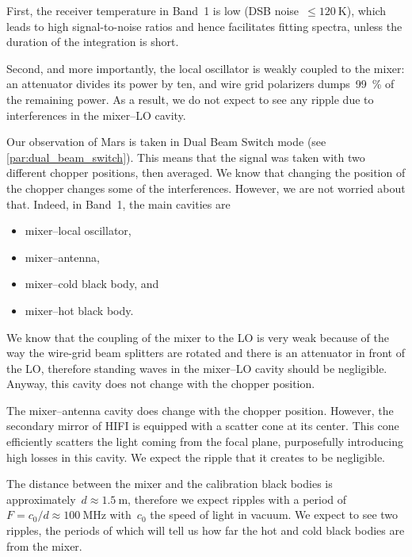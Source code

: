 First, the receiver temperature in Band~1 is low (DSB noise~$\le \SI{120}{\kelvin}$),
which leads to high signal-to-noise ratios
and hence facilitates fitting spectra, unless the duration of the integration
is short.

Second, and more importantly, the local oscillator is weakly coupled to the mixer:
an attenuator divides its power by ten, and wire grid polarizers dumps~\SI{99}{\percent} of the remaining power.
As a result, we do not expect to see any ripple due to interferences in the mixer--LO cavity.



Our observation of Mars is taken in Dual Beam Switch mode (see \vref{par:dual_beam_switch}).
This means that the signal was taken with two different chopper positions, then averaged.
We know that changing the position of the chopper changes some of the interferences.
However, we are not worried about that.
Indeed, in Band~1, the main cavities are
\begin{itemize}
    \item mixer--local oscillator,
    \item mixer--antenna,
    \item mixer--cold black body, and
    \item mixer--hot black body.
\end{itemize}
We know that the coupling of the mixer to the LO is very weak because of the way the wire-grid beam splitters are rotated and there is an attenuator in front of the LO, therefore standing waves in the mixer--LO cavity should be negligible.
Anyway, this cavity does not change with the chopper position.

The mixer--antenna cavity does change with the chopper position.
However, the secondary mirror of HIFI is equipped with a scatter cone at its center.
This cone efficiently scatters the light coming from the focal plane, purposefully introducing high losses in this cavity.
We expect the ripple that it creates to be negligible.

The distance between the mixer and the calibration black bodies is approximately~$d \approx \SI{1.5}{\meter}$, therefore we expect ripples with a period of $F = c_0/d \approx \SI{100}{\mega\hertz}$ with~$c_0$ the speed of light in vacuum.
We expect to see two ripples, the periods of which will tell us how far the hot and cold black bodies are from the mixer.

